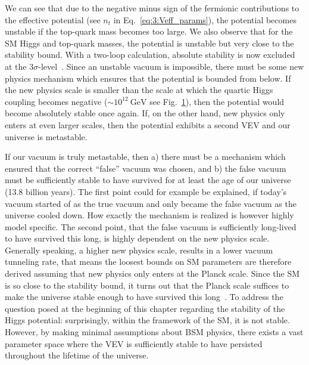 \begin{figure}[ht]
\begin{minipage}[t]{0.48\textwidth}
  \label{fig:3:running_couplings}
  \end{minipage}
\end{figure}
We can see that due to the negative minus sign of the fermionic contributions to the effective potential (see $n_t$ in Eq.~\eqref{eq:3:Veff_params}), the potential becomes unstable if the top-quark mass becomes too large. We also observe that for the \acs{SM} Higgs and top-quark masses, the potential is unstable but very close to the stability bound. With a two-loop calculation, absolute stability is now excluded at the $3\sigma$-level~\cite{Degrassi:2012ry}. Since an unstable vacuum is impossible, there must be some new physics mechanism which ensures that the potential is bounded from below. If the new physics scale is smaller than the scale at which the quartic Higgs coupling becomes negative ($\sim 10^{12}\ \mathrm{GeV}$ see Fig.~\ref{fig:3:running_couplings}), then the potential would become absolutely stable once again. If, on the other hand, new physics only enters at even larger scales, then the potential exhibits a second \acs{VEV} and our universe is metastable.

If our vacuum is truly metastable, then a) there must be a mechanism which ensured that the correct ``false'' vacuum was chosen, and b) the false vacuum must be sufficiently stable to have survived for at least the age of our universe (13.8 billion years). The first point could for example be explained, if today's vacuum started of as the true vacuum and only became the false vacuum as the universe cooled down. How exactly the mechanism is realized is however highly model specific. The second point, that the false vacuum is sufficiently long-lived to have survived this long, is highly dependent on the new physics scale. Generally speaking, a higher new physics scale, results in a lower vacuum tunneling rate, that means the loosest bounds on \acs{SM} parameters are therefore derived assuming that new physics only enters at the Planck scale. Since the \acs{SM} is so close to the stability bound, it turns out that the Planck scale suffices to make the universe stable enough to have survived this long~\cite{Degrassi:2012ry}. To address the question posed at the beginning of this chapter regarding the stability of the Higgs potential: surprisingly, within the framework of the \acs{SM}, it is not stable. However, by making minimal assumptions about \acs{BSM} physics, there exists a vast parameter space where the \acs{VEV} is sufficiently stable to have persisted throughout the lifetime of the universe.


